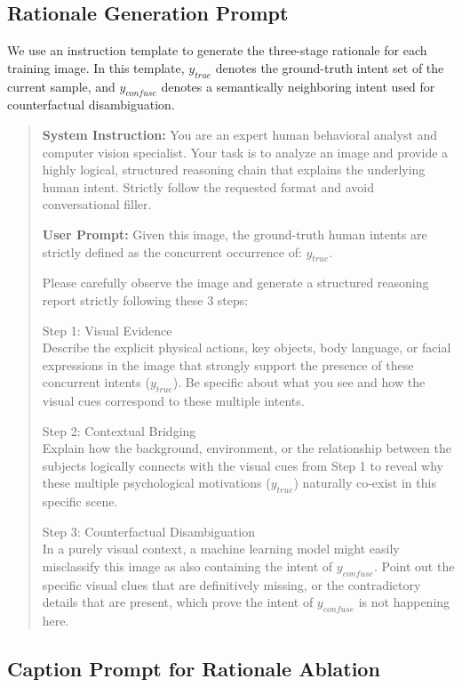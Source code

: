 \subsection{Rationale Generation Prompt}
\label{app:rationale_prompt}

We use an instruction template to generate the three-stage rationale for each training image.
In this template, ${y_{true}}$ denotes the ground-truth intent set of the current sample, and ${y_{confuse}}$ denotes a semantically neighboring intent used for counterfactual disambiguation.

\begin{quote}
\textbf{System Instruction:} You are an expert human behavioral analyst and computer vision specialist. Your task is to analyze an image and provide a highly logical, structured reasoning chain that explains the underlying human intent. Strictly follow the requested format and avoid conversational filler.

\textbf{User Prompt:} Given this image, the ground-truth human intents are strictly defined as the concurrent occurrence of: ${y_{true}}$.

Please carefully observe the image and generate a structured reasoning report strictly following these 3 steps:

Step 1: Visual Evidence \\
Describe the explicit physical actions, key objects, body language, or facial expressions in the image that strongly support the presence of these concurrent intents (${y_{true}}$). Be specific about what you see and how the visual cues correspond to these multiple intents.

Step 2: Contextual Bridging \\
Explain how the background, environment, or the relationship between the subjects logically connects with the visual cues from Step 1 to reveal why these multiple psychological motivations (${y_{true}}$) naturally co-exist in this specific scene.

Step 3: Counterfactual Disambiguation \\
In a purely visual context, a machine learning model might easily misclassify this image as also containing the intent of ${y_{confuse}}$. Point out the specific visual clues that are definitively missing, or the contradictory details that are present, which prove the intent of ${y_{confuse}}$ is not happening here.
\end{quote}

\subsection{Caption Prompt for Rationale Ablation}

